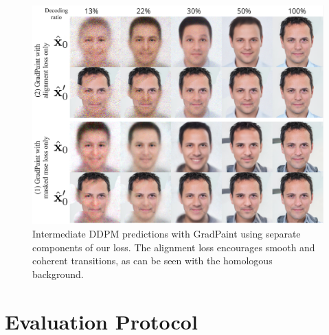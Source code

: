 \begin{figure}[htbp]
  \hspace{-1.5cm}
  \includegraphics[width=1.2\linewidth]{images/gradpaint/losses1.pdf}
  \caption{Intermediate \ac{DDPM} predictions with GradPaint using separate components of our loss. 
  The alignment loss encourages smooth and coherent transitions, as can be seen with the homologous background.}
\label{fig:loss_intuition-int}
\end{figure}







\section{Evaluation Protocol}


